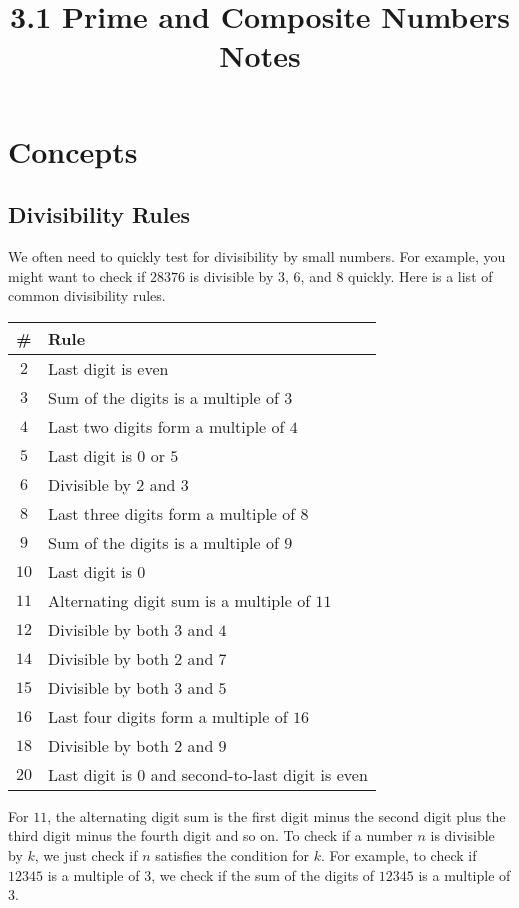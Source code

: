 \documentclass{article}
\title{3.1 Prime and Composite Numbers Notes}
\author{}
\date{}
\begin{document}
\maketitle

\section*{Concepts}
\begin{multicols}{2}
	
	\subsection*{Divisibility Rules}
	We often need to quickly test for divisibility by small numbers.
	For example, you might want to check if $28376$ is divisible by $3$, $6$, and $8$ quickly.
	Here is a list of common divisibility rules.
	
	\begin{tabular}{|c|l|}
		\hline
		\# & Rule \\
		\hline
		$2$    & Last digit is even \\
		$3$    & Sum of the digits is a multiple of $3$ \\
		$4$    & Last two digits form a multiple of $4$ \\
		$5$    & Last digit is $0$ or $5$ \\
		$6$    & Divisible by $2$ and $3$ \\
		$8$    & Last three digits form a multiple of $8$ \\
		$9$    & Sum of the digits is a multiple of $9$ \\
		$10$   & Last digit is $0$ \\
		$11$   & Alternating digit sum is a multiple of $11$ \\
		$12$   & Divisible by both $3$ and $4$ \\
		$14$   & Divisible by both $2$ and $7$ \\
		$15$   & Divisible by both $3$ and $5$ \\
		$16$   & Last four digits form a multiple of $16$ \\
		$18$   & Divisible by both $2$ and $9$ \\
		$20$   & Last digit is $0$ and second-to-last digit is even \\
		\hline
	\end{tabular}
	
	For $11$, the alternating digit sum is the first digit minus the second digit plus the third digit minus the fourth digit and so on.
	To check if a number $n$ is divisible by $k$, we just check if $n$ satisfies the condition for $k$.
	For example, to check if $12345$ is a multiple of $3$, we check if the sum of the digits of $12345$ is a multiple of $3$.
	

\end{multicols}
\end{document}
